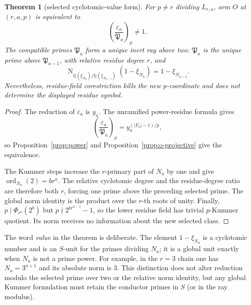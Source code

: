 \documentclass[11pt]{article}
\newtheorem{theorem}{Theorem}[section]
\theoremstyle{definition}
\theoremstyle{remark}
\begin{document}
\begin{theorem}[selected cyclotomic-value form]\label{thm:o-symbol}
For $p\ne r$ dividing $L_{r,a}$, arm $O$ at $(r,a,p)$ is equivalent to
\[
  \left(\frac{\varepsilon_a}{\mathfrak P_a}\right)_p\ne1.
\]
The compatible primes $\mathfrak P_a$ form a unique inert ray above two:
$\mathfrak P_a$ is the unique prime above $\mathfrak P_{a-1}$, with
relative residue degree $r$, and
\[
 \operatorname N_{\mathbb Q(\xi_{N_a})/
                     \mathbb Q(\xi_{N_{a-1}})}(1-\xi_{N_a})
 =1-\xi_{N_{a-1}}.
\]
Nevertheless, residue-field corestriction kills the new $p$-coordinate and
does not determine the displayed residue symbol.
\end{theorem}

\begin{proof}
The reduction of $\varepsilon_a$ is $y_a$.  The unramified power-residue
formula gives
\[
 \left(\frac{\varepsilon_a}{\mathfrak P_a}\right)_p
 =y_a^{(|F_a|-1)/p},
\]
so Proposition~\ref{prop:power} and
Proposition~\ref{prop:o-projective} give the equivalence.

The Kummer steps increase the $r$-primary part of $N_a$ by one and give
$\operatorname{ord}_{N_a}(2)=br^a$.  The relative cyclotomic degree and
the residue-degree ratio are therefore both $r$, forcing one prime above the
preceding selected prime.  The global norm identity is the product over the
$r$-th roots of unity.  Finally,
$p\mid\Phi_{r^a}(2^b)$ but $p\nmid2^{br^{a-1}}-1$, so the lower residue
field has trivial $p$-Kummer quotient.  Its norm receives no information
about the new selected class.
\end{proof}

The word \emph{value} in the theorem is deliberate.  The element
$1-\xi_{N_a}$ is a cyclotomic number and is an $S$-unit for the primes
dividing $N_a$; it is a global unit exactly when $N_a$ is not a prime power.
For example, in the $r=3$ chain one has $N_a=3^{a+1}$ and its absolute norm
is $3$.  This distinction does not alter reduction modulo the selected prime
over two or the relative norm identity, but any global Kummer formulation
must retain the conductor primes in $S$ (or in the ray modulus).
\end{document}
